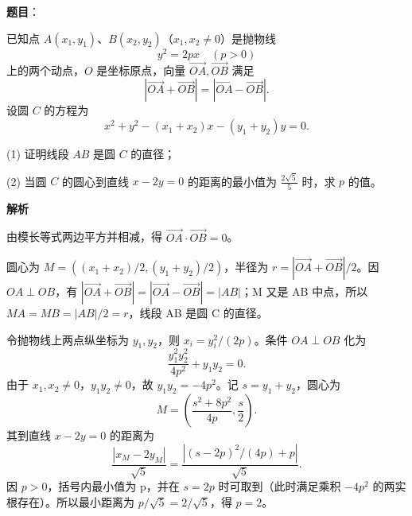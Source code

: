 \begin{answer}

\textbf{题目}：

已知点 \(A(x_1,y_1)、B(x_2,y_2)\)（\(x_1,x_2\ne0\)）是抛物线
\nopagebreak[4]
\[
y^2=2px\quad(p>0)
\]
上的两个动点，\(O\) 是坐标原点，向量 \(\overrightarrow{OA},\overrightarrow{OB}\) 满足
\nopagebreak[4]
\[
\left|\overrightarrow{OA}+\overrightarrow{OB}\right|=
\left|\overrightarrow{OA}-\overrightarrow{OB}\right|.
\]
设圆 \(C\) 的方程为
\nopagebreak[4]
\[
x^2+y^2-(x_1+x_2)x-(y_1+y_2)y=0.
\]

(1) 证明线段 \(AB\) 是圆 \(C\) 的直径；

(2) 当圆 \(C\) 的圆心到直线 \(x-2y=0\) 的距离的最小值为 \(\frac{2\sqrt5}{5}\) 时，求 \(p\) 的值。

\textbf{解析}

由模长等式两边平方并相减，得 $\overrightarrow{OA}\cdot\overrightarrow{OB}=0$。


圆心为 $M=((x_1+x_2)/2,(y_1+y_2)/2)$，半径为 $r=|\overrightarrow{OA}+\overrightarrow{OB}|/2$。因 $OA\perp OB$，有 $|\overrightarrow{OA}+\overrightarrow{OB}|=|\overrightarrow{OA}-\overrightarrow{OB}|=|AB|$；M 又是 AB 中点，所以 $MA=MB=|AB|/2=r$，线段 AB 是圆 C 的直径。


令抛物线上两点纵坐标为 $y_1,y_2$，则 $x_i=y_i^2/(2p)$。条件 $OA\perp OB$ 化为
\nopagebreak[4]
\[
\frac{y_1^2y_2^2}{4p^2}+y_1y_2=0.
\]
由于 $x_1,x_2\ne0$，$y_1y_2\ne0$，故 $y_1y_2=-4p^2$。记 $s=y_1+y_2$，圆心为
\nopagebreak[4]
\[
M=\left(\frac{s^2+8p^2}{4p},\frac{s}{2}\right).
\]
其到直线 $x-2y=0$ 的距离为
\nopagebreak[4]
\[
\frac{|x_M-2y_M|}{\sqrt5}
=\frac{|(s-2p)^2/(4p)+p|}{\sqrt5}.
\]
因 $p>0$，括号内最小值为 p，并在 $s=2p$ 时可取到（此时满足乘积 $-4p^2$ 的两实根存在）。所以最小距离为 $p/\sqrt5=2/\sqrt5$，得 $p=2$。



\end{answer}